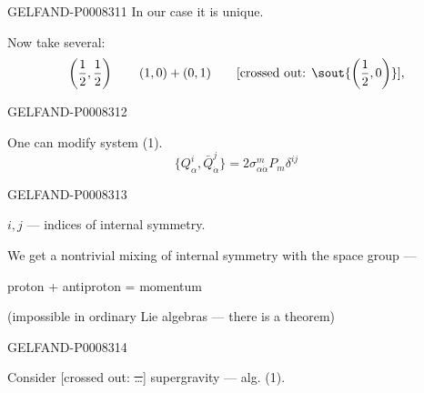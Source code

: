 \begin{GelfandAdjacentEvidence}{GELFAND-P000831}{1}
In our case it is unique.

Now take several:
\[
\left(\frac12,\frac12\right)\qquad (1,0)+(0,1)\qquad
\text{[crossed out: \sout{\(\left(\frac12,0\right)\)}]},
\]
\end{GelfandAdjacentEvidence}
\begin{GelfandAdjacentEvidence}{GELFAND-P000831}{2}


One can modify system (1).
\begin{equation*}
\{Q_\alpha^i,\bar Q_{\dot\alpha}^j\}
=2\sigma^m_{\alpha\dot\alpha}P_m\delta^{ij}
\tag{2}
\end{equation*}
\end{GelfandAdjacentEvidence}
\begin{GelfandAdjacentEvidence}{GELFAND-P000831}{3}

\(i,j\) — indices of internal symmetry.

We get a nontrivial mixing of internal symmetry with the space group —

proton + antiproton = momentum

(impossible in ordinary Lie algebras — there is a theorem)

\end{GelfandAdjacentEvidence}
\begin{GelfandAdjacentEvidence}{GELFAND-P000831}{4}


Consider [crossed out: \sout{…}] supergravity — alg. (1).
\end{GelfandAdjacentEvidence}
